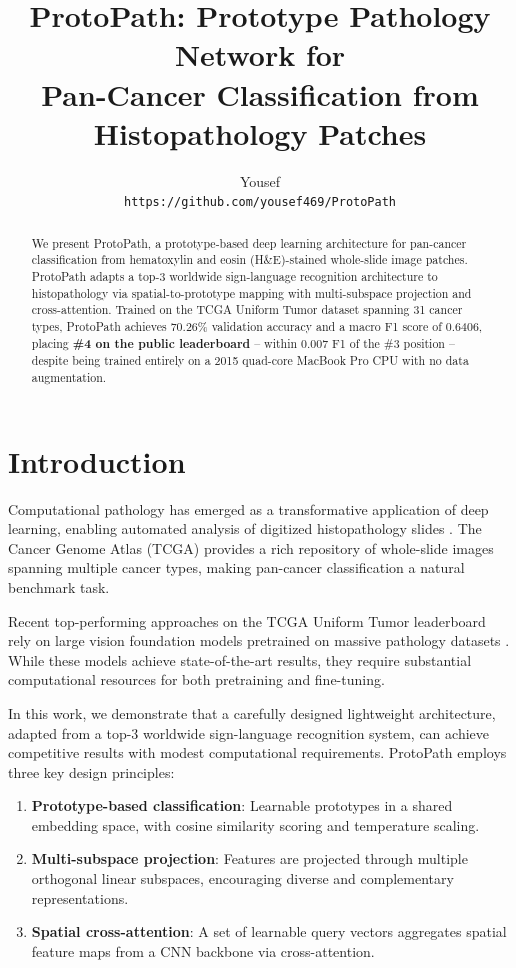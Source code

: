 \documentclass[11pt,twocolumn]{article}
\title{ProtoPath: Prototype Pathology Network for \\ Pan-Cancer Classification from Histopathology Patches}
\author{Yousef \\
\texttt{https://github.com/yousef469/ProtoPath}
}
\begin{document}
\maketitle

\begin{abstract}
We present ProtoPath, a prototype-based deep learning architecture for pan-cancer classification from hematoxylin and eosin (H\&E)-stained whole-slide image patches. ProtoPath adapts a top-3 worldwide sign-language recognition architecture to histopathology via spatial-to-prototype mapping with multi-subspace projection and cross-attention. Trained on the TCGA Uniform Tumor dataset spanning 31 cancer types, ProtoPath achieves 70.26\% validation accuracy and a macro F1 score of 0.6406, placing \textbf{\#4 on the public leaderboard} -- within 0.007 F1 of the \#3 position -- despite being trained entirely on a 2015 quad-core MacBook Pro CPU with no data augmentation.
\end{abstract}

\section{Introduction}

Computational pathology has emerged as a transformative application of deep learning, enabling automated analysis of digitized histopathology slides \cite{srinidhi2021survey}. The Cancer Genome Atlas (TCGA) provides a rich repository of whole-slide images spanning multiple cancer types, making pan-cancer classification a natural benchmark task.

Recent top-performing approaches on the TCGA Uniform Tumor leaderboard rely on large vision foundation models pretrained on massive pathology datasets \cite{chen2024uni, vorontsov2024virchow}. While these models achieve state-of-the-art results, they require substantial computational resources for both pretraining and fine-tuning.

In this work, we demonstrate that a carefully designed lightweight architecture, adapted from a top-3 worldwide sign-language recognition system, can achieve competitive results with modest computational requirements. ProtoPath employs three key design principles:

\begin{enumerate}[nosep]
    \item \textbf{Prototype-based classification}: Learnable prototypes in a shared embedding space, with cosine similarity scoring and temperature scaling.
    \item \textbf{Multi-subspace projection}: Features are projected through multiple orthogonal linear subspaces, encouraging diverse and complementary representations.
    \item \textbf{Spatial cross-attention}: A set of learnable query vectors aggregates spatial feature maps from a CNN backbone via cross-attention.
\end{enumerate}
\end{document}
